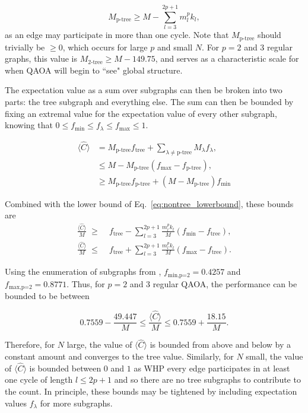 \documentclass[prb,reprint,nofootinbib,longbibliography,superscriptaddress]{revtex4-1}
\begin{document}
\begin{equation}\label{eq:nontree_lowerbound}
    M_\text{p-tree} \geq M - \sum_{l=3}^{2p+1} m_l^pk_l ,
\end{equation}
as an edge may participate in more than one cycle. Note that $M_\text{p-tree}$ should trivially be $\geq 0$, which occurs for large $p$ and small $N$. For $p=2$ and 3 regular graphs, this value is $M_\text{2-tree}\geq M - 149.75$, and serves as a characteristic scale for when QAOA will begin to ``see" global structure.

The expectation value as a sum over subgraphs can then be broken into two parts: the tree subgraph and everything else. The sum can then be bounded by fixing an extremal value for the expectation value of every other subgraph, knowing that $0\leq f_\text{min}\leq  f_\lambda\leq f_\text{max}\leq 1$.

\begin{align}
    \langle \hat C \rangle &= M_\text{p-tree} f_\text{tree} + \sum_{\lambda\neq\text{p-tree}} M_\lambda f_\lambda,\\
    &\leq M - M_\text{p-tree}(f_\text{max}-f_\text{p-tree}),\\
    &\geq M_\text{p-tree}f_\text{p-tree}+(M-M_\text{p-tree})f_\text{min}
\end{align}

Combined with the lower bound of Eq.~\ref{eq:nontree_lowerbound}, these bounds are
\begin{align}
    \frac{\langle \hat C\rangle}{M}\;\geq\;&f_\text{tree} - \sum_{l=3}^{2p+1} \frac{m_l^pk_l}{M}(f_\text{min} - f_\text{tree}),\\
    \frac{\langle \hat C\rangle}{M}\;\leq\;&f_\text{tree} + \sum_{l=3}^{2p+1} \frac{m_l^pk_l}{M}(f_\text{max} - f_\text{tree}).
\end{align}

Using the enumeration of subgraphs from \cite{Wurtz_guarantee}, $f_\text{min,p=2}=0.4257$ and $f_\text{max,p=2}=0.8771$. Thus, for $p=2$ and 3 regular QAOA, the performance can be bounded to be between

\begin{equation}
    0.7559 - \frac{49.447}{M} \leq \frac{\langle \hat C\rangle}{M} \leq 0.7559 + \frac{18.15}{M}.
\end{equation}


Therefore, for $N$ large, the value of $\langle\hat C\rangle$ is bounded from above and below by a constant amount and converges to the tree value. Similarly, for $N$ small, the value of $\langle \hat C\rangle$ is bounded between $0$ and $1$ as WHP every edge participates in at least one cycle of length $l\leq2p+1$ and so there are no tree subgraphs to contribute to the count. In principle, these bounds may be tightened by including expectation values $f_\lambda$ for more subgraphs.
\end{document}
